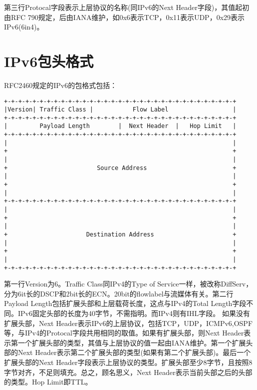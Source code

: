 第三行Protocal字段表示上层协议的名称(同IPv6的Next Header字段)，其值起初由RFC 790规定，后由IANA维护，如0x6表示TCP，0x11表示UDP，0x29表示IPv6(6in4)。

\section{IPv6包头格式}
RFC2460规定的IPv6的包格式包括：

\begin{center}
    \begin{lstlisting}
+-+-+-+-+-+-+-+-+-+-+-+-+-+-+-+-+-+-+-+-+-+-+-+-+-+-+-+-+-+-+-+-+
|Version| Traffic Class |           Flow Label                  |
+-+-+-+-+-+-+-+-+-+-+-+-+-+-+-+-+-+-+-+-+-+-+-+-+-+-+-+-+-+-+-+-+
|         Payload Length        |  Next Header  |   Hop Limit   |
+-+-+-+-+-+-+-+-+-+-+-+-+-+-+-+-+-+-+-+-+-+-+-+-+-+-+-+-+-+-+-+-+
|                                                               |
+                                                               +
|                                                               |
+                         Source Address                        +
|                                                               |
+                                                               +
|                                                               |
+-+-+-+-+-+-+-+-+-+-+-+-+-+-+-+-+-+-+-+-+-+-+-+-+-+-+-+-+-+-+-+-+
|                                                               |
+                                                               +
|                                                               |
+                      Destination Address                      +
|                                                               |
+                                                               +
|                                                               |
+-+-+-+-+-+-+-+-+-+-+-+-+-+-+-+-+-+-+-+-+-+-+-+-+-+-+-+-+-+-+-+-+

\end{lstlisting}
\end{center}

第一行Version为6。Traffic Class同IPv4的Type of Service一样，被改称DiffServ，分为6it长的DSCP和2bit长的ECN。20bit的flowlabel与流媒体有关。第二行Payload Length包括扩展头部和上层载荷长度，这点与IPv4的Total Length字段不同。IPv6固定头部的长度为40字节，不需指明。而IPv4则有IHL字段。
如果没有扩展头部，Next Header表示IPv6的上层协议，包括TCP，UDP，ICMPv6,OSPF等，与IPv4的Protocal字段共用相同的取值。如果有扩展头部，则Next Header表示第一个扩展头部的类型，其值与上层协议的值一起由IANA维护。第一个扩展头部的Next Header表示第二个扩展头部的类型(如果有第二个扩展头部)。最后一个扩展头部的Next Header字段表示上层协议的类型。扩展头部至少8字节，且按照8字节对齐，不足则填充。总之，顾名思义，Next Header表示当前头部之后的头部的类型。Hop Limit即TTL。


